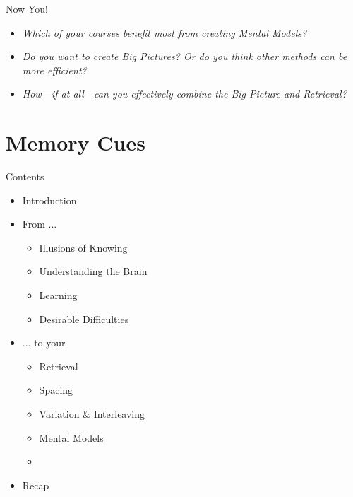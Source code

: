 \documentclass{ercisbeamer}
\begin{document}
\begin{frame}{Now You!}
    \begin{itemize}
        \item \emph{Which of your courses benefit most from creating Mental Models?}
        \item \emph{Do you want to create Big Pictures? Or do you think other methods can be more efficient?}
        \item \emph{How---if at all---can you effectively combine the Big Picture and Retrieval?}
    \end{itemize}
\end{frame}

\section{Memory Cues}
\begin{frame}{Contents}
    \begin{itemize}
        \item Introduction
        \item From ...
        \begin{itemize}
            \item Illusions of Knowing
            \item Understanding the Brain
            \item Learning
            \item Desirable Difficulties
        \end{itemize}
        \item ... to your 
        \begin{itemize}
            \item Retrieval
            \item Spacing
            \item Variation \& Interleaving
            \item Mental Models
            \item {}
        \end{itemize}
        \item Recap
    \end{itemize}
\end{frame}
\end{document}

